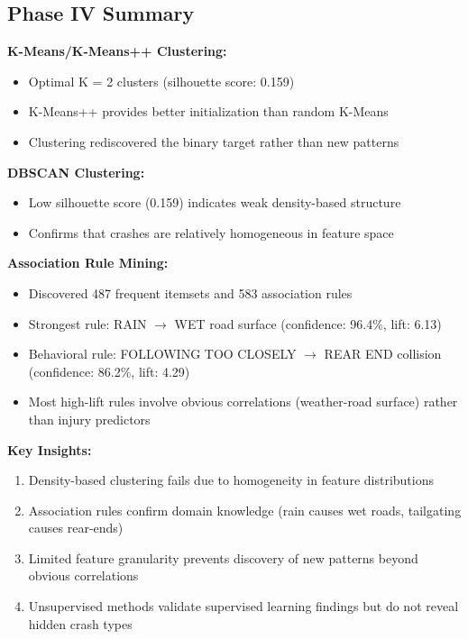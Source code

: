 \documentclass[stu,12pt,floatsintext]{apa7}
\begin{document}
\subsection{Phase IV Summary}

\textbf{K-Means/K-Means++ Clustering:}
\begin{itemize}
    \item Optimal K = 2 clusters (silhouette score: 0.159)
    \item K-Means++ provides better initialization than random K-Means
    \item Clustering rediscovered the binary target rather than new patterns
\end{itemize}

\textbf{DBSCAN Clustering:}
\begin{itemize}
    \item Low silhouette score (0.159) indicates weak density-based structure
    \item Confirms that crashes are relatively homogeneous in feature space
\end{itemize}

\textbf{Association Rule Mining:}
\begin{itemize}
    \item Discovered 487 frequent itemsets and 583 association rules
    \item Strongest rule: RAIN $\rightarrow$ WET road surface (confidence: 96.4\%, lift: 6.13)
    \item Behavioral rule: FOLLOWING TOO CLOSELY $\rightarrow$ REAR END collision (confidence: 86.2\%, lift: 4.29)
    \item Most high-lift rules involve obvious correlations (weather-road surface) rather than injury predictors
\end{itemize}

\textbf{Key Insights:}
\begin{enumerate}
    \item Density-based clustering fails due to homogeneity in feature distributions
    \item Association rules confirm domain knowledge (rain causes wet roads, tailgating causes rear-ends)
    \item Limited feature granularity prevents discovery of new patterns beyond obvious correlations
    \item Unsupervised methods validate supervised learning findings but do not reveal hidden crash types
\end{enumerate}
\end{document}
